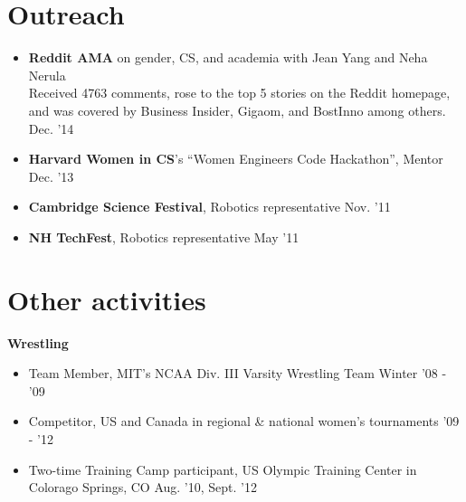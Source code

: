 \documentclass[margin]{res}
\begin{document}
\begin{resume}
\section{Outreach}
\begin{itemize}[leftmargin=*] \itemsep -2pt
\item {\bf Reddit AMA} on gender, CS, and academia with Jean Yang and Neha Nerula  \\
Received 4763 comments, rose to the top 5 stories on the Reddit homepage, and was covered by Business Insider, Gigaom, and BostInno among others. \hfill Dec. '14
\item {\bf Harvard Women in CS}'s ``Women Engineers Code Hackathon'', Mentor \hfill Dec. '13
\item {\bf Cambridge Science Festival}, Robotics representative \hfill Nov. '11
\item {\bf NH TechFest}, Robotics representative \hfill May '11

\end{itemize}

\section{Other activities}
{\bf Wrestling}
\begin{itemize}[leftmargin=*] \itemsep -2pt
\item Team Member, MIT's NCAA Div. III Varsity Wrestling Team \hfill Winter '08 - '09
\item Competitor, US and Canada in regional \& national women's tournaments \hfill '09 - '12
\item Two-time Training Camp participant, US Olympic Training Center in Colorago Springs, CO \hfill Aug. '10, Sept. '12


\end{itemize}

\end{resume} 
 
\end{document}
